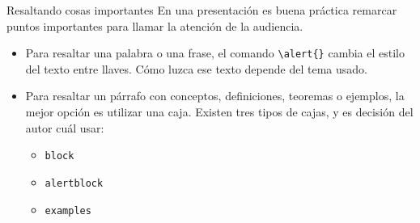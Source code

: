 \documentclass{beamer}
\begin{document}
    \begin{frame}[fragile]{Resaltando cosas importantes}
        \justifying
        En una presentación es \alert{buena práctica} remarcar puntos importantes para llamar
        la \alert{atención} de la audiencia.
        \begin{itemize}
            \justifying
            \item Para resaltar una palabra o una frase, el comando {\color{mygreen}\verb|\alert{}|} cambia
            el estilo del texto entre llaves. Cómo luzca ese texto depende del tema usado.
            \item Para resaltar un párrafo con conceptos, definiciones, teoremas o ejemplos, la mejor opción
            es utilizar una caja. Existen tres tipos de cajas, y es decisión del autor cuál usar:
            \begin{itemize}
                \item \verb|block|
                \item \verb|alertblock|
                \item \verb|examples|
            \end{itemize}
        \end{itemize}
    \end{frame}
\end{document}
